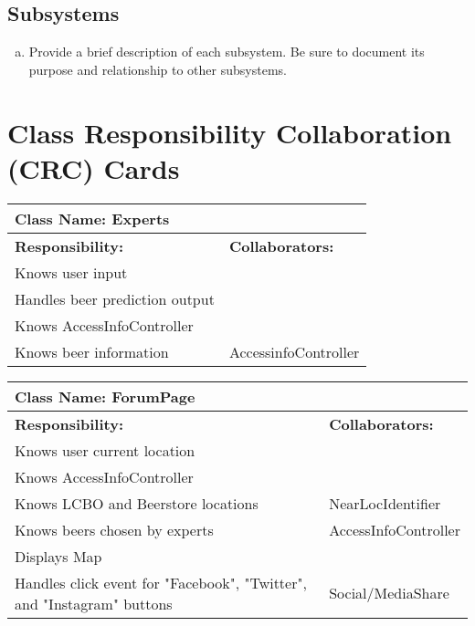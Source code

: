 \documentclass[]{article}
\begin{document}
\subsection{Subsystems}
\label{sub:subsystems}
\begin{enumerate}[a)]
	\item Provide a brief description of each subsystem. Be sure to document its purpose and relationship to other subsystems.
\end{enumerate}

	
\section{Class Responsibility Collaboration (CRC) Cards}
\label{sec:class_responsibility_collaboration_crc_cards}

	\begin{table}[ht]
		\centering
		\begin{tabular}{|p{5cm}|p{5cm}|}
		\hline 
		 \multicolumn{2}{|l|}{\textbf{Class Name: Experts}} \\
		\hline
		\textbf{Responsibility:} & \textbf{Collaborators:} \\
		\hline
		Knows user input  & \\
		\hline
		Handles beer prediction output & \\
		\hline
		Knows AccessInfoController & \\
		\hline
		Knows beer information & AccessinfoController\\
		\hline
		
		\end{tabular}
	\end{table}
	
	\begin{table}[ht]
		\centering
		\begin{tabular}{|p{5cm}|p{5cm}|}
		\hline 
		\multicolumn{2}{|l|}{\textbf{Class Name: ForumPage}} \\
		\hline
		\textbf{Responsibility:} & \textbf{Collaborators:} \\
		\hline
		Knows user current location  & \\
		\hline
		Knows AccessInfoController & \\
		\hline
		Knows LCBO and Beerstore locations & NearLocIdentifier\\
		\hline
		Knows beers chosen by experts & AccessInfoController\\
		\hline
	    Displays Map  & \\
	    \hline
		Handles click event for "Facebook", "Twitter", and "Instagram" buttons & Social/MediaShare\\
		\hline
		\end{tabular}
	\end{table}	
\end{document}
